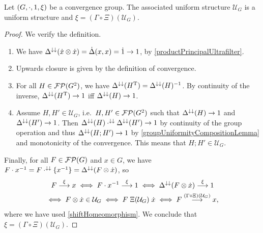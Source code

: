 \begin{proposition} \label{groupUniformStructure}
Let $\sSet{G, \cdot, 1, \xi}$ be a convergence group. The associated uniform structure $\mathcal{U}_G$ is a uniform structure and $\xi = (\Gamma\circ\Xi)(\mathcal{U}_G)$.
\end{proposition}
\begin{proof}
We verify the definition.
\begin{enumerate}
\item We have $\Delta^{\downarrow\downarrow}(\dot{x}\otimes\dot{x}) = \dot{\Delta}(x,x) = \dot{1} \to 1$, by \ref{productPrincipalUltrafilter}.
\item Upwards closure is given by the definition of convergence.
\item For all $H\in \operatorname{\mathcal{FP}}(G^2)$, we have $\Delta^{\downarrow\downarrow}(H^{\mathrm{T}}) = \Delta^{\downarrow\downarrow}(H)^{-1}$. By continuity of the inverse, $\Delta^{\downarrow\downarrow}(H^{\mathrm{T}})\to 1$ iff $\Delta^{\downarrow\downarrow}(H)\to 1$.
\item Assume $H,H'\in \mathcal{U}_G$, i.e.\ $H,H'\in \operatorname{\mathcal{FP}}(G^2)$ such that $\Delta^{\downarrow\downarrow}(H) \to 1$ and $\Delta^{\downarrow\downarrow}(H') \to 1$. Then $\Delta^{\downarrow\downarrow}(H) \cdot^{\downarrow\downarrow} \Delta^{\downarrow\downarrow}(H')\to 1$ by continuity of the group operation and thus $\Delta^{\downarrow\downarrow}(H;H') \to 1$ by \ref{groupUniformityCompositionLemma} and monotonicity of the convergence. This means that $H;H'\in \mathcal{U}_G$.
\end{enumerate}
Finally, for all $F\in \operatorname{\mathcal{FP}}(G)$ and $x\in G$, we have $F\cdot x^{-1} = F\cdot^{\downarrow\downarrow}\{x^{-1}\} = \Delta^{\downarrow\downarrow}(F\otimes \dot{x})$, so
\begin{multline*} F\overset{\xi}{\longrightarrow} x \iff F\cdot x^{-1} \overset{\xi}{\longrightarrow} 1 \iff \Delta^{\downarrow\downarrow}(F\otimes \dot{x}) \overset{\xi}{\longrightarrow} 1 \\ \iff F\otimes \dot{x}\in \mathcal{U}_G \iff F\mathrel{\Xi(\mathcal{U}_G)}\dot{x} \iff F\overset{(\Gamma\circ\Xi)(\mathcal{U}_G)}{\longrightarrow} x, \end{multline*}
where we have used \ref{shiftHomeomorphism}. We conclude that $\xi = (\Gamma\circ\Xi)(\mathcal{U}_G)$.
\end{proof}


